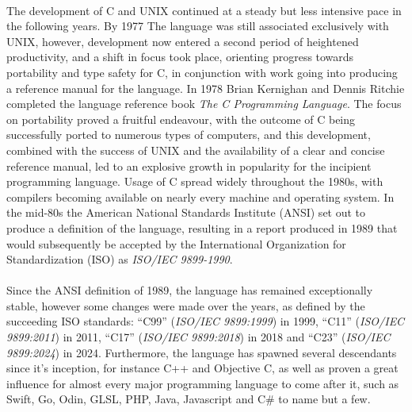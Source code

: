\documentclass{report}%
\begin{document}
\paragraph{}
The development of C and UNIX continued at a steady but less intensive pace in the following years. By 1977 The language was still associated exclusively with UNIX, however, development now entered a second period of heightened productivity, and a shift in focus took place, orienting progress towards portability and type safety for C, in conjunction with work going into producing a reference manual for the language. In 1978 Brian Kernighan and Dennis Ritchie completed the language reference book \textit{The C Programming Language}. The focus on portability proved a fruitful endeavour, with the outcome of C being successfully ported to numerous types of computers, and this development, combined with the success of UNIX and the availability of a clear and concise reference manual, led to an explosive growth in popularity for the incipient programming language. Usage of C spread widely throughout the 1980s, with compilers becoming available on nearly every machine and operating system. In the mid-80s the American National Standards Institute (ANSI) set out to produce a definition of the language, resulting in a report produced in 1989 that would subsequently be accepted by the International Organization for Standardization (ISO) as \textit{ISO/IEC 9899-1990}.

\paragraph{}
Since the ANSI definition of 1989, the language has remained exceptionally stable, however some changes were made over the years, as defined by the succeeding ISO standards: “C99” (\textit{ISO/IEC 9899:1999}) in 1999, “C11” (\textit{ISO/IEC 9899:2011}) in 2011, “C17” (\textit{ISO/IEC 9899:2018}) in 2018 and “C23” (\textit{ISO/IEC 9899:2024}) in 2024. Furthermore, the language has spawned several descendants since it's inception, for instance C++ and Objective C, as well as proven a great influence for almost every major programming language to come after it, such as Swift, Go, Odin, GLSL, PHP, Java, Javascript and C\# to name but a few.

\vspace{0.5cm}

\hrulefill

\vspace{0.5cm}
\end{document}

